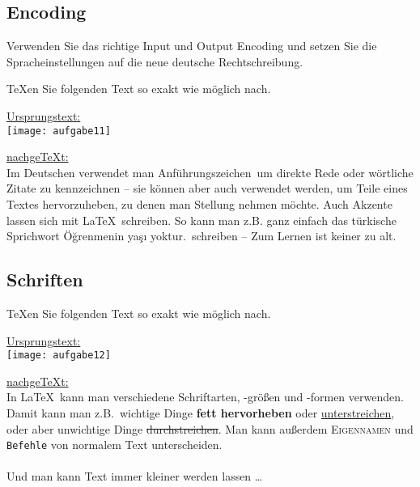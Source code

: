 \subsection{Encoding}
\begin{aufgabe}
Verwenden Sie das richtige Input und Output Encoding und setzen Sie die Spracheinstellungen auf die neue deutsche Rechtschreibung.	
\end{aufgabe}

\begin{aufgabe}
\TeX en Sie folgenden Text so exakt wie m\"oglich nach.	
\end{aufgabe}
\noindent \underline{Ursprungstext:} \\
\noindent\texttt{[image: aufgabe11]}

\noindent \underline{nachge\TeX t:}\\
\singlespacing
\indent Im Deutschen verwendet man \glqq Anführungszeichen\grqq \ um direkte Rede oder wörtliche Zitate zu kennzeichnen -- 
sie können aber auch verwendet werden, um Teile eines Textes hervorzuheben, zu denen man Stellung nehmen möchte.
Auch Akzente lassen sich mit \LaTeX\ schreiben.
So kann man z.B. ganz einfach das türkische Sprichwort \glqq Ö\u{g}renmenin ya\c{s}{\i} yoktur.\grqq \ schreiben  -- 
\glqq Zum Lernen ist keiner zu alt.\grqq

\subsection{Schriften}
\begin{aufgabe}
\TeX en Sie folgenden Text so exakt wie m\"oglich nach.	
\end{aufgabe}

\noindent \underline{Ursprungstext:} \\
\noindent\texttt{[image: aufgabe12]}

\noindent \underline{nachge\TeX t:}\\
\nonfrenchspacing
\indent 
In \LaTeX\ kann man verschiedene Schriftarten, -größen und -formen verwenden.
Damit kann man z.B.\  wichtige Dinge \textbf{fett hervorheben} oder \underline{unterstreichen}, oder aber unwichtige Dinge
\sout{durchstreichen}.
Man kann außerdem \textsc{Eigennamen} und \texttt{Befehle} von normalem Text unterscheiden.
\frenchspacing
\\
\\
\noindent\hspace*{21mm}
\Huge{Und} \huge{man} \LARGE{kann} \Large{Text} \large{immer} \normalsize{kleiner} \small{werden} \footnotesize{lassen}
\dots

